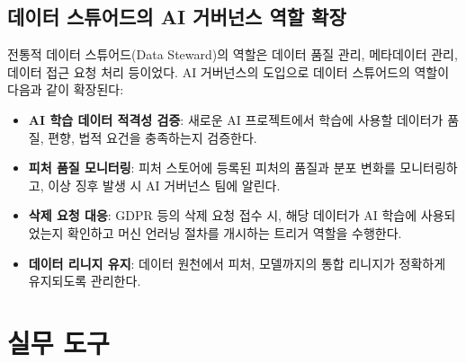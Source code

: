 \subsection{데이터 스튜어드의 AI 거버넌스 역할 확장}
\label{sec:9.5.3}

전통적 데이터 스튜어드(Data Steward)의 역할은 데이터 품질 관리, 메타데이터 관리, 데이터 접근 요청 처리 등이었다. AI 거버넌스의 도입으로 데이터 스튜어드의 역할이 다음과 같이 확장된다:

\begin{itemize}
 \item \textbf{AI 학습 데이터 적격성 검증}: 새로운 AI 프로젝트에서 학습에 사용할 데이터가 품질, 편향, 법적 요건을 충족하는지 검증한다.
 \item \textbf{피처 품질 모니터링}: 피처 스토어에 등록된 피처의 품질과 분포 변화를 모니터링하고, 이상 징후 발생 시 AI 거버넌스 팀에 알린다.
 \item \textbf{삭제 요청 대응}: GDPR 등의 삭제 요청 접수 시, 해당 데이터가 AI 학습에 사용되었는지 확인하고 머신 언러닝 절차를 개시하는 트리거 역할을 수행한다.
 \item \textbf{데이터 리니지 유지}: 데이터 원천에서 피처, 모델까지의 통합 리니지가 정확하게 유지되도록 관리한다.
\end{itemize}


\section{실무 도구}
\label{sec:9.6}

